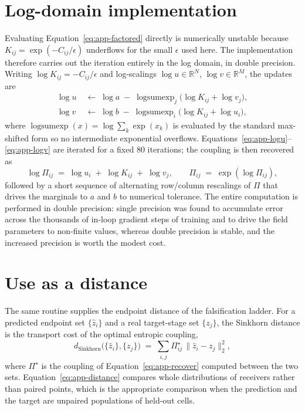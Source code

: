\section{Log-domain implementation}

Evaluating Equation~\ref{eq:app-factored} directly is numerically unstable because $K_{ij} =
\exp(-C_{ij}/\epsilon)$ underflows for the small $\epsilon$ used here. The implementation therefore
carries out the iteration entirely in the log domain, in double precision. Writing $\log K_{ij} =
-C_{ij}/\epsilon$ and log-scalings $\log u \in \mathbb{R}^{N}$, $\log v \in \mathbb{R}^{M}$, the updates
are
\begin{align}
\log u \;&\leftarrow\; \log a \;-\; \operatorname{logsumexp}_{j}\bigl(\log K_{ij} + \log v_j\bigr), \label{eq:app-logu}\\
\log v \;&\leftarrow\; \log b \;-\; \operatorname{logsumexp}_{i}\bigl(\log K_{ij} + \log u_i\bigr), \label{eq:app-logv}
\end{align}
where $\operatorname{logsumexp}(x) = \log \sum_k \exp(x_k)$ is evaluated by the standard max-shifted
form so no intermediate exponential overflows. Equations~\ref{eq:app-logu}--\ref{eq:app-logv} are
iterated for a fixed $80$ iterations; the coupling is then recovered as
\begin{equation}\label{eq:app-recover}
\log \Pi_{ij} \;=\; \log u_i \;+\; \log K_{ij} \;+\; \log v_j ,
\qquad
\Pi_{ij} \;=\; \exp\!\left(\log \Pi_{ij}\right),
\end{equation}
followed by a short sequence of alternating row/column rescalings of $\Pi$ that drives the marginals to
$a$ and $b$ to numerical tolerance. The entire computation is performed in double precision: single
precision was found to accumulate error across the thousands of in-loop gradient steps of training and
to drive the field parameters to non-finite values, whereas double precision is stable, and the
increased precision is worth the modest cost.

\section{Use as a distance}

The same routine supplies the endpoint distance of the falsification ladder. For a predicted endpoint
set $\{\hat z_i\}$ and a real target-stage set $\{z_j\}$, the Sinkhorn distance is the transport cost of
the optimal entropic coupling,
\begin{equation}\label{eq:app-distance}
d_{\mathrm{Sinkhorn}}\bigl(\{\hat z_i\}, \{z_j\}\bigr) \;=\; \sum_{i,j} \Pi^{\star}_{ij}\, \lVert \hat z_i - z_j \rVert_2^2 ,
\end{equation}
where $\Pi^{\star}$ is the coupling of Equation~\ref{eq:app-recover} computed between the two sets.
Equation~\ref{eq:app-distance} compares whole distributions of receivers rather than paired points,
which is the appropriate comparison when the prediction and the target are unpaired populations of
held-out cells.